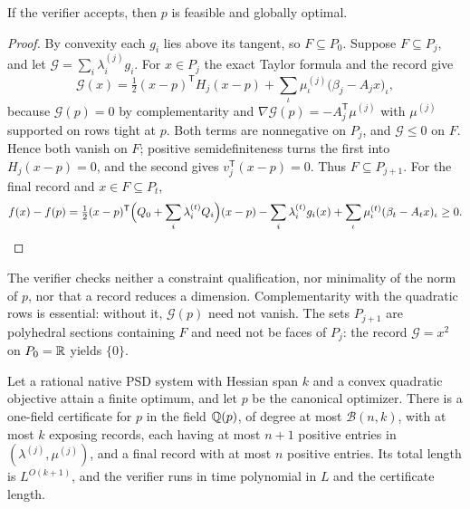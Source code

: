 \begin{lemma}[Soundness]
\label{lem:qc-sound}
If the verifier accepts, then $p$ is feasible and globally optimal.
\end{lemma}

\begin{proof}
By convexity each $g_i$ lies above its tangent, so $F\subseteq P_0$. Suppose
$F\subseteq P_j$, and let $\mathcal G=\sum_i\lambda^{(j)}_ig_i$. For $x\in P_j$
the exact Taylor formula and the record give
\[
\mathcal G(x)=\tfrac12(x-p)^{\mathsf T}H_j(x-p)+
\sum_\iota\mu^{(j)}_\iota\bigl(\beta_j-A_jx\bigr)_\iota ,
\]
because $\mathcal G(p)=0$ by complementarity and $\nabla\mathcal G(p)=
-A_j^{\mathsf T}\mu^{(j)}$ with $\mu^{(j)}$ supported on rows tight at $p$. Both
terms are nonnegative on $P_j$, and $\mathcal G\le0$ on $F$. Hence both vanish
on $F$; positive semidefiniteness turns the first into $H_j(x-p)=0$, and the
second gives $v_j^{\mathsf T}(x-p)=0$. Thus $F\subseteq P_{j+1}$. For the final
record and $x\in F\subseteq P_t$,
\[
f(x)-f(p)=\tfrac12(x-p)^{\mathsf T}\Bigl(Q_0+\sum_i\lambda^{(t)}_iQ_i\Bigr)(x-p)
-\sum_i\lambda^{(t)}_ig_i(x)+\sum_\iota\mu^{(t)}_\iota(\beta_t-A_tx)_\iota\ge0 .
\qedhere
\]
\end{proof}

The verifier checks neither a constraint qualification, nor minimality of the
norm of $p$, nor that a record reduces a dimension. Complementarity with the
quadratic rows is essential: without it, $\mathcal G(p)$ need not vanish. The
sets $P_{j+1}$ are polyhedral sections containing $F$ and need not be faces of
$P_j$: the record $\mathcal G=x^2$ on $P_0=\mathbb R$ yields $\{0\}$.

\begin{theorem}
\label{thm:qc-certificate}
Let a rational native PSD system with Hessian span $k$ and a convex quadratic
objective attain a finite optimum, and let $p$ be the canonical optimizer.
There is a one-field certificate for $p$ in the field $\mathbb Q(p)$, of degree at
most $\mathcal B(n,k)$, with at most $k$ exposing records, each having at most
$n+1$ positive entries in $(\lambda^{(j)},\mu^{(j)})$, and a final record with at
most $n$ positive entries. Its total length is $L^{O(k+1)}$, and the verifier
runs in time polynomial in $L$ and the certificate length.
\end{theorem}

